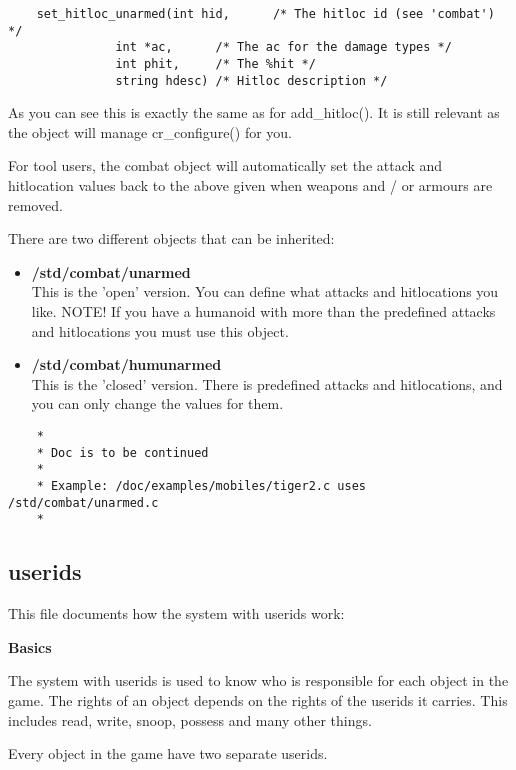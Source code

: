 \begin{verbatim}
    set_hitloc_unarmed(int hid,      /* The hitloc id (see 'combat') */
               int *ac,      /* The ac for the damage types */
               int phit,     /* The %hit */
               string hdesc) /* Hitloc description */
\end{verbatim}

As you can see this is exactly the same as for add\_hitloc(). It is still
relevant as the object will manage cr\_configure() for you.

For tool users, the combat object will automatically set the attack and
hitlocation values back to the above given when weapons and / or armours are
removed.

There are two different objects that can be
inherited:

\begin{itemize}
\item{\bf /std/combat/unarmed} \\
        This is the 'open' version. You can define what attacks
        and hitlocations you like. 
        NOTE!
        If you have a humanoid with more than the predefined
        attacks and hitlocations you must use this object.

\item{\bf /std/combat/humunarmed} \\
        This is the 'closed' version. There is predefined
        attacks and hitlocations, and you can only change the
        values for them.
\end{itemize}

\begin{verbatim}
    *
    * Doc is to be continued
    *
    * Example: /doc/examples/mobiles/tiger2.c uses /std/combat/unarmed.c
    *
\end{verbatim}


\subsection{userids}

This file documents how the system with userids work:

{\bf Basics}

The system with userids is used to know who is responsible for each object 
in the game. The rights of an object depends on the rights of the userids it
carries. This includes read, write, snoop, possess and many other things.

Every object in the game have two separate userids. 

